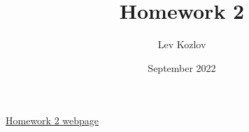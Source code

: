 \documentclass{article}
\title{Homework 2}
\author{Lev Kozlov}
\date{September 2022}
\begin{document}
\maketitle

\href{https://lvjonok.github.io/f22-theoretical-mechanics/2022/09/14/homework2.html}{Homework 2 webpage}



\newpage


\end{document}
